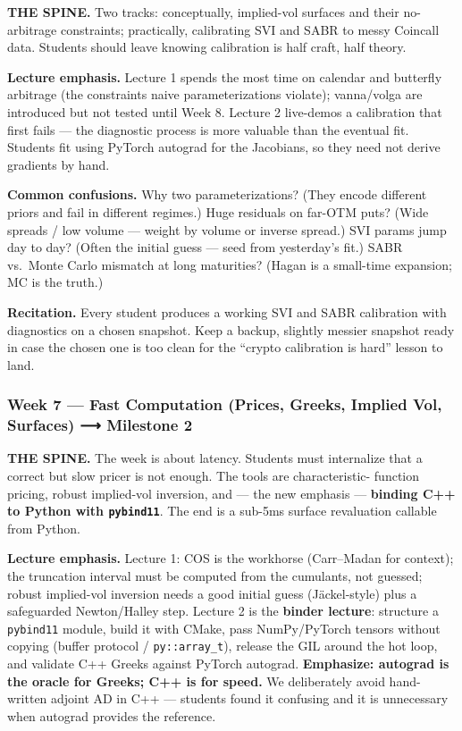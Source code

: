 \documentclass[
]{article}
\begin{document}
\textbf{THE SPINE.} Two tracks: conceptually, implied-vol surfaces and
their no-arbitrage constraints; practically, calibrating SVI and SABR to
messy Coincall data. Students should leave knowing calibration is half
craft, half theory.

\textbf{Lecture emphasis.} Lecture 1 spends the most time on calendar
and butterfly arbitrage (the constraints naive parameterizations
violate); vanna/volga are introduced but not tested until Week 8.
Lecture 2 live-demos a calibration that first fails --- the diagnostic
process is more valuable than the eventual fit. Students fit using
PyTorch autograd for the Jacobians, so they need not derive gradients by
hand.

\textbf{Common confusions.} Why two parameterizations? (They encode
different priors and fail in different regimes.) Huge residuals on
far-OTM puts? (Wide spreads / low volume --- weight by volume or inverse
spread.) SVI params jump day to day? (Often the initial guess --- seed
from yesterday's fit.) SABR vs.~Monte Carlo mismatch at long maturities?
(Hagan is a small-time expansion; MC is the truth.)

\textbf{Recitation.} Every student produces a working SVI and SABR
calibration with diagnostics on a chosen snapshot. Keep a backup,
slightly messier snapshot ready in case the chosen one is too clean for
the ``crypto calibration is hard'' lesson to land.

\subsubsection{Week 7 --- Fast Computation (Prices, Greeks, Implied Vol,
Surfaces) ⟶ Milestone
2}\label{week-7-fast-computation-prices-greeks-implied-vol-surfaces-milestone-2}

\textbf{THE SPINE.} The week is about latency. Students must internalize
that a correct but slow pricer is not enough. The tools are
characteristic- function pricing, robust implied-vol inversion, and ---
the new emphasis --- \textbf{binding C++ to Python with
\texttt{pybind11}}. The end is a sub-5ms surface revaluation callable
from Python.

\textbf{Lecture emphasis.} Lecture 1: COS is the workhorse (Carr--Madan
for context); the truncation interval must be computed from the
cumulants, not guessed; robust implied-vol inversion needs a good
initial guess (Jäckel-style) plus a safeguarded Newton/Halley step.
Lecture 2 is the \textbf{binder lecture}: structure a \texttt{pybind11}
module, build it with CMake, pass NumPy/PyTorch tensors without copying
(buffer protocol / \texttt{py::array\_t}), release the GIL around the
hot loop, and validate C++ Greeks against PyTorch autograd.
\textbf{Emphasize: autograd is the oracle for Greeks; C++ is for speed.}
We deliberately avoid hand-written adjoint AD in C++ --- students found
it confusing and it is unnecessary when autograd provides the reference.
\end{document}
